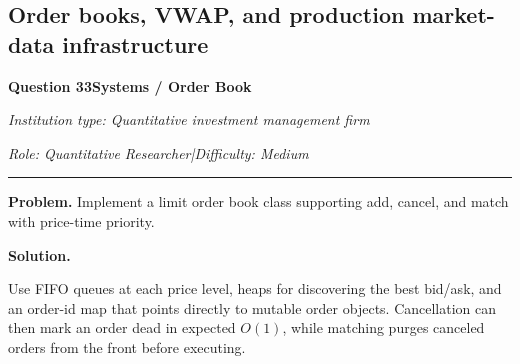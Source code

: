 \documentclass[11pt,letterpaper,openany]{book}
\newcommand{\InterviewQuestionHeader}[5]{%
  \vspace{1.0em}%
  {\large\bfseries #1\enspace #4\par}%
  {\small\itshape Institution type: #2\par}%
  {\small\itshape Role: #3\enspace |\enspace Difficulty: #5\par}%
  \vspace{0.25em}\hrule\vspace{0.45em}%
}
\begin{document}
\subsection{Order books, VWAP, and production market-data infrastructure}

\InterviewQuestionHeader{Question 33}{Quantitative investment management firm}{Quantitative Researcher}{Systems / Order Book}{Medium}
\textbf{Problem.} Implement a limit order book class supporting add, cancel, and match with price-time priority.

\textbf{Solution.}


Use FIFO queues at each price level, heaps for discovering the best bid/ask, and an order-id map that points directly to mutable order objects. Cancellation can then mark an order dead in expected \(O(1)\), while matching purges canceled orders from the front before executing.
\end{document}
